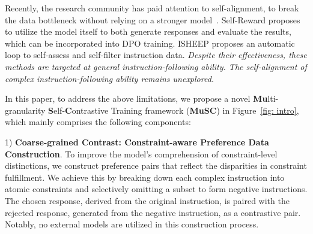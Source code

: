 Recently, the research community has paid attention to self-alignment, to break the data bottleneck without relying on a stronger model~\cite{wang2024comprehensivesurveyllmalignment, zhang2024surveyselfplaymethodsreinforcement}. Self-Reward \cite{yuan2024selfrewardinglanguagemodels} proposes to utilize the model itself to both generate responses and evaluate the results, which can be incorporated into DPO training. ISHEEP \cite{liang2024isheepselfalignmentllmscratch} proposes an automatic loop to self-assess and self-filter instruction data. \textit{Despite their effectiveness, these methods are targeted at general instruction-following ability. The self-alignment of complex instruction-following ability remains unexplored.}

In this paper, to address the above limitations, we propose a novel \textbf{Mu}lti-granularity \textbf{S}elf-\textbf{C}ontrastive Training framework (\textbf{MuSC}) in Figure~\ref{fig: intro}, which mainly comprises the following components:

1) \textbf{Coarse-grained Contrast: Constraint-aware Preference Data Construction}.  
To improve the model's comprehension of constraint-level distinctions, we construct preference pairs that reflect the disparities in constraint fulfillment. We achieve this by breaking down each complex instruction into atomic constraints and selectively omitting a subset to form negative instructions. The chosen response, derived from the original instruction, is paired with the rejected response, generated from the negative instruction, as a contrastive pair. Notably, no external models are utilized in this construction process.



